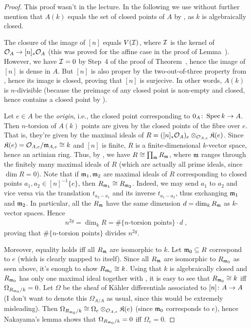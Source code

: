\documentclass[a4paper,parskip=half,numbers=enddot, DIV=12]{scrreprt}
\begin{document}
\begin{proof}
	This proof wasn't in the lecture. In the following we use without further mention that $A(k)$ equals the set of closed points of $A$ by , as $k$ is algebraically closed.
	
	The closure of the image of $[n]$ equals $V(\mathcal{I})$, where $\mathcal{I}$ is the kernel of $\Oo_A\morphism[][n]_*\Oo_A$ (this was proved for the affine case in  the proof of Lemma~). However, we have $\mathcal{I}=0$ by Step~4 of the proof of Theorem~, hence the image of $[n]$ is dense in $A$. But $[n]$ is also proper by the two-out-of-three property from \cite[Proposition~2.4.1]{alggeo2}, hence its image is closed, proving that $[n]$ is surjecive. In other words, $A(k)$ is $n$-divisible (because the preimage of any closed point is non-empty and closed, hence contains a closed point by \cite[Proposition~2.1.1]{alggeo2}).
	
	Let $e\in A$ be the \emph{origin}, i.e., the closed point corresponding to $0_A\colon \Spec k\morphism A$. Then $n$-torsion of $A(k)$ points are given by the closed points of the fibre over $e$. That is, they're given by the maximal ideals of $R=([n]_*\mathcal{O}_A)_e\otimes_{\mathcal{O}_{A,e}}\mathfrak{K}(e)$. Since $\mathfrak{K}(e)=\mathcal{O}_{A,e}/\mathfrak{m}_{A,e}\cong k$ and $[n]$ is finite, $R$ is a finite-dimensional $k$-vector space, hence an artinian ring. Thus, by \cite[Corollary~2.16]{eisenbudCommAlg}, we have $R\cong \prod_{\mathfrak{m}} R_{\mathfrak{m}}$, where $\mathfrak{m}$ ranges through the finitely many maximal ideals of $R$ (which are actually all prime ideals, since $\dim R=0$). Note that if $\mathfrak{m}_1,\mathfrak{m}_2$ are maximal ideals of $R$ corresponding to closed points $a_1,a_2\in[n]^{-1}\{e\}$, then $R_{\mathfrak{m}_1}\cong R_{\mathfrak{m}_2}$. Indeed, we may send $a_1$ to $a_2$ and vice versa via the translation $t_{a_2-a_1}$ and its inverse $t_{a_1-a_2}$, thus exchanging $\mathfrak{m}_1$ and $\mathfrak{m}_2$. In particular, all the $R_{\mathfrak{m}}$ have the same dimension $d=\dim_k R_{\mathfrak{m}}$ as $k$-vector spaces. Hence
	\begin{align*}
		n^{2g}=\dim_k R=\#\{n\text{-torsion points}\}\cdot d\;,
	\end{align*}
	proving that $\#\{n\text{-torsion points}\}$ divides $n^{2g}$.
	
	Moreover, equality holds iff all $R_{\mathfrak{m}}$ are isomorphic to $k$. Let $\mathfrak{m}_0\subseteq R$ correspond to $e$ (which is clearly mapped to itself). Since all $R_{\mathfrak{m}}$ are isomorphic to $R_{\mathfrak{m}_0}$ as seen above, it's enough to show $R_{\mathfrak{m}_0}\cong k$. Using that $k$ is algebraically closed and $R_{\mathfrak{m}_0}$ has only one maximal ideal together with \cite[Corollary~16.16]{eisenbudCommAlg}, it is easy to see that $R_{\mathfrak{m}_0}\cong k$ iff $\Omega_{R_{\mathfrak{m}_0}/k}=0$. Let $\Omega$ be the sheaf of Kähler differentials associated to $[n]\colon A\morphism A$ (I don't want to denote this $\Omega_{A/A}$ as usual, since this would be extremely misleading). Then $\Omega_{R_{\mathfrak{m}_0}/k}\cong \Omega_e\otimes_{\mathcal{O}_{A,e}}\mathfrak{K}(e)$ (since $\mathfrak{m}_0$ corresponds to $e$), hence Nakayama's lemma shows that $\Omega_{R_{\mathfrak{m}_0}/k}=0$ iff $\Omega_e=0$.
	

\end{proof}
\end{document}
